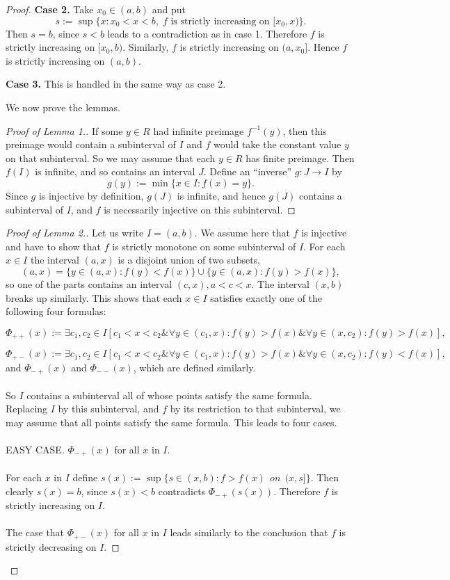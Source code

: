 \documentclass{amsart}
\numberwithin{equation}{subsection}
\theoremstyle{plain}
\theoremstyle{definition}
\theoremstyle{remark}
\begin{document}
\begin{proof}
\noindent\textbf{Case 2.} Take $x_0 \in (a,b)$ and put
\[ s := \sup\{x : x_0 < x < b, \; f \text{ is strictly increasing on } [x_0, x)\}. \]
Then $s = b$, since $s < b$ leads to a contradiction as in case 1. Therefore $f$ is strictly increasing on $[x_0, b)$. Similarly, $f$ is strictly increasing on $(a, x_0]$. Hence $f$ is strictly
increasing on $(a, b)$.

\noindent\textbf{Case 3.} This is handled in the same way as case 2.

We now prove the lemmas.
\begin{proof}[Proof of Lemma 1.] If some $y \in R$ had infinite preimage $f^{-1}(y)$, then this preimage would contain a subinterval of $I$ and $f$ would take the constant value $y$ on that subinterval. So we may assume that each $y \in R$ has finite preimage. Then $f(I)$ is infinite, and so contains an interval $J$. Define an ``inverse'' $g: J \to I$ by
\[ g(y) := \min\{x \in I : f(x) = y\}. \]
Since $g$ is injective by definition, $g(J)$ is infinite, and hence $g(J)$ contains a subinterval of $I$, and $f$ is necessarily injective on this subinterval.
\end{proof}
\begin{proof}[Proof of Lemma 2.] Let us write $I = (a,b)$. We assume here that $f$ is injective and have to show that $f$ is strictly monotone on some subinterval of $I$. For each $x\in I$ the interval $(a,x)$ is a disjoint union of two subsets,
\[
(a,x)= \{ y \in (a,x) : f(y) < f(x)\}\cup \{y\in (a,x) : f(y) > f(x)\},
\]
so one of the parts contains an interval $(c,x), a < c < x$. The interval $(x,b)$ breaks up similarly. This shows that each $x\in I$ satisfies exactly one of the following four formulas:

\[
\Phi_{++}(x) := \exists c_1,c_2\in I [c_1 < x < c_2 \& \forall y\in (c_1,x) : f(y) > f(x) \& \forall y\in (x,c_2) : f(y) > f(x)],
\]

\[
\Phi_{+-}(x) := \exists c_1,c_2\in I [c_1 < x < c_2 \& \forall y\in (c_1,x) : f(y) > f(x) \& \forall y\in (x,c_2) : f(y) < f(x)],
\]
and $\Phi_{-+}(x)$ and $\Phi_{--}(x)$, which are defined similarly.
\\ \\ So $I$ contains a subinterval all of whose points satisfy the same formula. Replacing $I$ by this subinterval, and $f$ by its restriction to that subinterval, we may assume that all points satisfy the same formula. This leads to four cases.
\\\\EASY CASE. $\Phi_{-+}(x)$ for all $x$ in $I$.
\\\\ For each $x$ in $I$ define $s(x) := \sup\{s\in (x,b) : f > f(x) \:\: on \:\: (x,s] \}$. Then clearly $s(x) = b$, since $s(x) < b$ contradicts $\Phi_{-+}(s(x))$. Therefore $f$ is strictly increasing on $I$.
\\\\ The case that $\Phi_{+-}(x)$ for all $x$ in $I$ leads similarly to the conclusion that $f$ is strictly decreasing on $I$.


\end{proof}
\end{proof}
\end{document}
